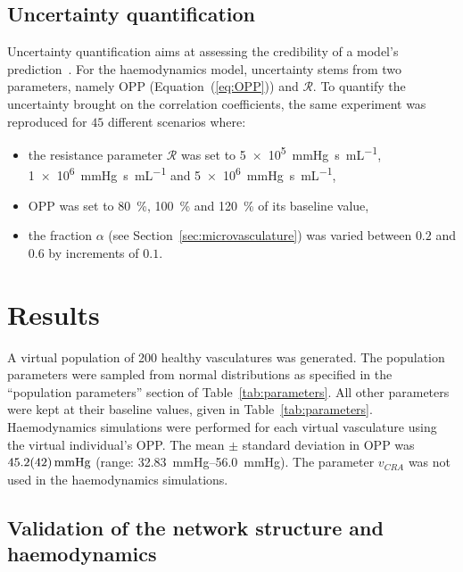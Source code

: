 \documentclass[11pt,]{article}
\begin{document}
\subsection{Uncertainty quantification}\label{sec:methods-UQ}

Uncertainty quantification aims at assessing the credibility of a model's prediction~\cite{ASME2018,Viceconti2021}.
For the haemodynamics model, uncertainty stems from two parameters, namely OPP (Equation~(\ref{eq:OPP})) and $\mathcal R$.
To quantify the uncertainty brought on the correlation coefficients, the same experiment was reproduced for $45$ different scenarios where:
\begin{itemize}
\item the resistance parameter $\mathcal R$ was set to \SI[per-mode=symbol]{5e5}{\mmHg\second\per\mL}, \SI[per-mode=symbol]{1e6}{\mmHg\second\per\mL} and \SI[per-mode=symbol]{5e6}{\mmHg\second\per\mL},
\item OPP was set to \SI{80}{\percent}, \SI{100}{\percent} and \SI{120}{\percent} of its baseline value,
\item the fraction $\alpha$ (see Section~\ref{sec:microvasculature}) was varied between $0.2$ and $0.6$ by increments of $0.1$.
\end{itemize}

\section{Results}\label{sec:results}

A virtual population of 200 healthy vasculatures was generated.
The population parameters were sampled from normal distributions as specified in the ``population parameters'' section of Table~\ref{tab:parameters}. %
All other parameters were kept at their baseline values, given in Table~\ref{tab:parameters}.
Haemodynamics simulations were performed for each virtual vasculature using the virtual individual's OPP.
The mean $\pm$ standard deviation in OPP was $\SI{45.2 \pm 4.2}{\mmHg}$ (range: \SIrange{32.83}{56.0}{\mmHg}).
The parameter $v_{CRA}$ was not used in the haemodynamics simulations.

\subsection{Validation of the network structure and haemodynamics}\label{sec:validation}
\end{document}
